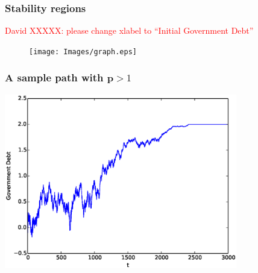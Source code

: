 \documentclass{beamer}
\begin{document}
\begin{frame}
   \frametitle{Stability regions}
   \textcolor{red}{David XXXXX: please change xlabel to ``Initial Government Debt''}
	\begin{figure}
		\begin{center}
		\texttt{[image: Images/graph.eps]}
	\end{center}	
	\end{figure}

  \end{frame}


 \begin{frame}

	\frametitle{A sample path with  $\bm{p} > 1$}
	\begin{center}
	\includegraphics[width=4in]{Images/port1.eps}
	\end{center}
\end{frame}
\end{document}
